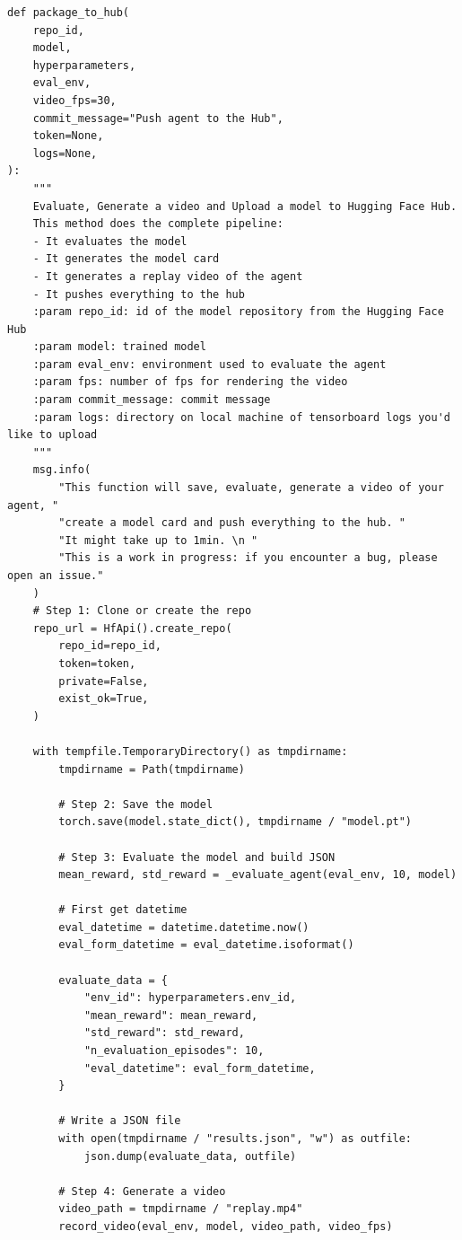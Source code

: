 \documentclass[11pt,a4paper]{article}
\begin{document}
\begin{lstlisting}
def package_to_hub(
    repo_id,
    model,
    hyperparameters,
    eval_env,
    video_fps=30,
    commit_message="Push agent to the Hub",
    token=None,
    logs=None,
):
    """
    Evaluate, Generate a video and Upload a model to Hugging Face Hub.
    This method does the complete pipeline:
    - It evaluates the model
    - It generates the model card
    - It generates a replay video of the agent
    - It pushes everything to the hub
    :param repo_id: id of the model repository from the Hugging Face Hub
    :param model: trained model
    :param eval_env: environment used to evaluate the agent
    :param fps: number of fps for rendering the video
    :param commit_message: commit message
    :param logs: directory on local machine of tensorboard logs you'd like to upload
    """
    msg.info(
        "This function will save, evaluate, generate a video of your agent, "
        "create a model card and push everything to the hub. "
        "It might take up to 1min. \n "
        "This is a work in progress: if you encounter a bug, please open an issue."
    )
    # Step 1: Clone or create the repo
    repo_url = HfApi().create_repo(
        repo_id=repo_id,
        token=token,
        private=False,
        exist_ok=True,
    )

    with tempfile.TemporaryDirectory() as tmpdirname:
        tmpdirname = Path(tmpdirname)

        # Step 2: Save the model
        torch.save(model.state_dict(), tmpdirname / "model.pt")

        # Step 3: Evaluate the model and build JSON
        mean_reward, std_reward = _evaluate_agent(eval_env, 10, model)

        # First get datetime
        eval_datetime = datetime.datetime.now()
        eval_form_datetime = eval_datetime.isoformat()

        evaluate_data = {
            "env_id": hyperparameters.env_id,
            "mean_reward": mean_reward,
            "std_reward": std_reward,
            "n_evaluation_episodes": 10,
            "eval_datetime": eval_form_datetime,
        }

        # Write a JSON file
        with open(tmpdirname / "results.json", "w") as outfile:
            json.dump(evaluate_data, outfile)

        # Step 4: Generate a video
        video_path = tmpdirname / "replay.mp4"
        record_video(eval_env, model, video_path, video_fps)


\end{lstlisting}
\end{document}
